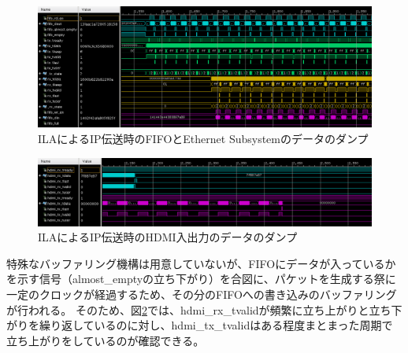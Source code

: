 \begin{figure}[htbp]
    \begin{center}
        \includegraphics[bb=0 0 1201 438,width=15.5cm]{img/fpga-ila-fifo-to-eth.png}
    \end{center}
    \caption{ILAによるIP伝送時のFIFOとEthernet Subsystemのデータのダンプ}
    \label{fig:fpga-ila-fifo-to-eth}
\end{figure}

\begin{figure}[htbp]
    \begin{center}
        \includegraphics[bb=0 0 1199 246,width=15.5cm]{img/fpga-ila-hdmi.png}
    \end{center}
    \caption{ILAによるIP伝送時のHDMI入出力のデータのダンプ}
    \label{fig:fpga-ila-hdmi}
\end{figure}


特殊なバッファリング機構は用意していないが、FIFOにデータが入っているかを示す信号（almost\_emptyの立ち下がり）を合図に、パケットを生成する祭に一定のクロックが経過するため、その分のFIFOへの書き込みのバッファリングが行われる。
そのため、図\ref{fig:fpga-ila-hdmi}では、hdmi\_rx\_tvalidが頻繁に立ち上がりと立ち下がりを繰り返しているのに対し、hdmi\_tx\_tvalidはある程度まとまった周期で立ち上がりをしているのが確認できる。
